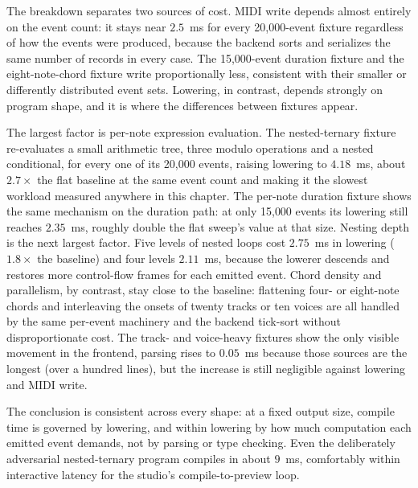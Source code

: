 The breakdown separates two sources of cost.
MIDI write depends almost entirely on the event count: it stays near $2.5$~ms for every 20{,}000-event fixture
regardless of how the events were produced, because the backend sorts and serializes the same number of records in
every case.
The 15{,}000-event duration fixture and the eight-note-chord fixture write proportionally less, consistent with their
smaller or differently distributed event sets.
Lowering, in contrast, depends strongly on program shape, and it is where the differences between fixtures appear.

The largest factor is per-note expression evaluation.
The nested-ternary fixture re-evaluates a small arithmetic tree, three modulo operations and a nested conditional, for
every one of its 20{,}000 events, raising lowering to $4.18$~ms, about $2.7\times$ the flat baseline at the same event
count and making it the slowest workload measured anywhere in this chapter.
The per-note duration fixture shows the same mechanism on the duration path: at only 15{,}000 events its lowering still
reaches $2.35$~ms, roughly double the flat sweep's value at that size.
Nesting depth is the next largest factor.
Five levels of nested loops cost $2.75$~ms in lowering ($1.8\times$ the baseline) and four levels $2.11$~ms, because the
lowerer descends and restores more control-flow frames for each emitted event.
Chord density and parallelism, by contrast, stay close to the baseline: flattening four- or eight-note chords and
interleaving the onsets of twenty tracks or ten voices are all handled by the same per-event machinery and the backend
tick-sort without disproportionate cost.
The track- and voice-heavy fixtures show the only visible movement in the frontend, parsing rises to $0.05$~ms because
those sources are the longest (over a hundred lines), but the increase is still negligible against lowering and MIDI
write.

The conclusion is consistent across every shape: at a fixed output size, compile time is governed by lowering, and
within lowering by how much computation each emitted event demands, not by parsing or type checking.
Even the deliberately adversarial nested-ternary program compiles in about $9$~ms, comfortably within interactive
latency for the studio's compile-to-preview loop.

